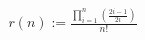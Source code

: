 \documentclass[preview]{standalone}
\begin{document}
\begin{align*}
r(n) := \frac{\displaystyle\prod_{i=1}^{n} \left(\frac{2i-1}{2i}\right)}{n!}
\end{align*}
\end{document}

